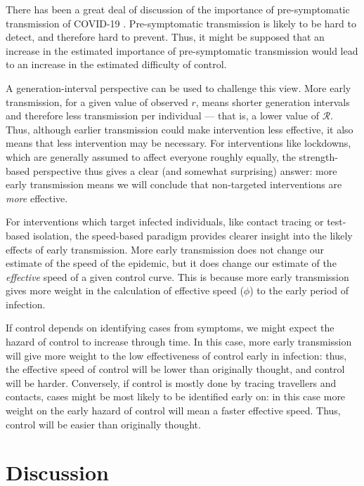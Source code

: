 \documentclass[12pt]{article}
\newcommand{\RR}{\ensuremath{{\mathcal R}}}
\newcommand{\rr}{\ensuremath{{r}}}
\begin{document}
There has been a great deal of discussion of the importance of pre-symptomatic transmission of COVID-19 \cite{ferretti2020quantifying, he2020temporal, hellewell2020feasibility}. 
Pre-symptomatic transmission is likely to be hard to detect, and therefore hard to prevent. 
Thus, it might be supposed that an increase in the estimated importance of pre-symptomatic transmission would lead to an increase in the estimated difficulty of control.

A generation-interval perspective \cite{park2019practical} can be used to challenge this view. 
More early transmission, for a given value of observed \rr, means {shorter generation intervals and therefore} less transmission per individual --- that is, a lower value of \RR. Thus, although earlier transmission could make intervention less effective, it also means that less intervention may be necessary. For interventions like lockdowns, which are generally assumed to affect everyone roughly equally, the strength-based perspective thus gives a clear (and somewhat surprising) answer: more early transmission means we will conclude that non-targeted interventions are \emph{more} effective.

For interventions which {target} infected individuals, like contact tracing or test-based isolation, the speed-based paradigm provides clearer insight into the likely effects of early transmission. 
More early transmission does not change our estimate of the speed of the epidemic, but it does change our estimate of the \emph{effective} speed of a given control curve. 
This is because more early transmission gives more weight in the calculation of effective speed ($\phi$) to the early period of infection.

If control depends on identifying cases from symptoms, we might expect the hazard of control to increase through time. In this case, more early transmission will give more weight to the low effectiveness of control early in infection: thus, the effective speed of control will be lower than originally thought, and control will be harder.
Conversely, if control is mostly done by tracing travellers and contacts, cases might be most likely to be identified early on: in this case more weight on the early hazard of control will mean a faster effective speed. Thus, control will be easier than originally thought. 

\section{Discussion}
\end{document}
